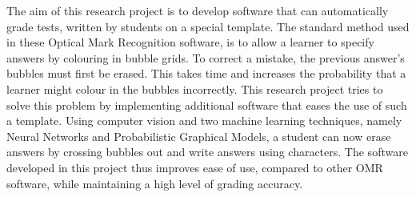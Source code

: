 


\begin{abstracts}        %
The aim of this research project is to develop software that can automatically grade tests, written by students on a special template. The standard method used in these Optical Mark Recognition software, is to allow a learner to specify answers by colouring in bubble grids. To correct a mistake, the previous answer's bubbles must first be erased. This takes time and increases the probability that a learner might colour in the bubbles incorrectly. This research project tries to solve this problem by implementing additional software that eases the use of such a template. Using computer vision and two machine learning techniques, namely Neural Networks and Probabilistic Graphical Models, a student can now erase answers by crossing bubbles out and write answers using characters. The software developed in this project thus improves ease of use, compared to other OMR software, while maintaining a high level of grading accuracy.
\end{abstracts}
